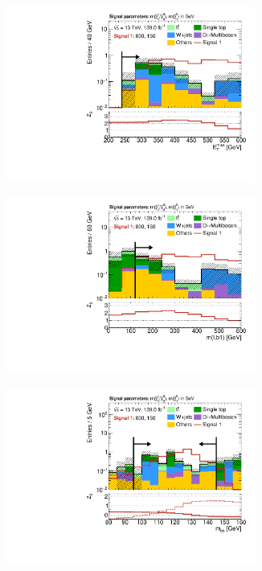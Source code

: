 \begin{figure}
\begin{subfigure}[b]{0.5\linewidth}
	\end{subfigure}\hfill
	\begin{subfigure}[b]{0.5\linewidth}
		\centering\includegraphics[width=0.9\textwidth]{N-1_cut_scan/n1_800_150/met}
	\end{subfigure}\hfill
	\begin{subfigure}[b]{0.5\linewidth}
		\centering\includegraphics[width=0.9\textwidth]{N-1_cut_scan/n1_800_150/mlb1}
	\end{subfigure}\hfill
	\begin{subfigure}[b]{0.5\linewidth}
		\centering\includegraphics[width=0.9\textwidth]{N-1_cut_scan/n1_800_150/mbb_both}

\end{subfigure}
\end{figure}
